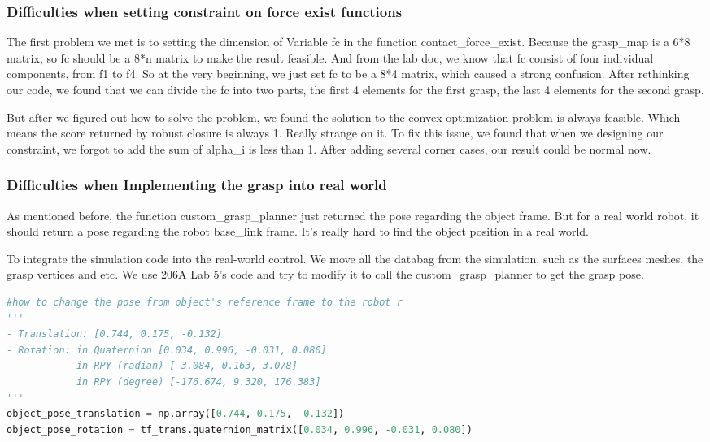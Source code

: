 \documentclass{article}
\begin{document}
\begin{multicols}{2}
\subsubsection{Difficulties when setting constraint on force exist functions}
The first problem we met is to setting the dimension of Variable fc in the function contact\_force\_exist. Because the grasp\_map is a 6*8 matrix, so fc should be a 8*n matrix to make the result feasible. And from the lab doc, we know that fc consist of four individual components, from f1 to f4. So at the very beginning, we just set fc to be a 8*4 matrix, which caused a strong confusion. After rethinking our code, we found that we can divide the fc into two parts, the first 4 elements for the first grasp, the last 4 elements for the second grasp.

But after we figured out how to solve the problem, we found the solution to the convex optimization problem is always feasible. Which means the score returned by robust closure is always 1. Really strange on it. To fix this issue, we found that when we designing our constraint, we forgot to add the sum of alpha\_i is less than 1. After adding several corner cases, our result could be normal now. 

\subsubsection{Difficulties when Implementing the grasp into real world}

As mentioned before, the function custom\_grasp\_planner just returned the pose regarding the object frame. But for a real world robot, it should return a pose regarding the robot base\_link frame. It's really hard to find the object position in a real world. 

To integrate the simulation code into the real-world control. We move all the databag from the simulation, such as the surfaces meshes, the grasp vertices and etc. We use 206A Lab 5's code and try to modify it to call the custom\_grasp\_planner to get the grasp pose. 

\begin{lstlisting}[language=Python]
#how to change the pose from object's reference frame to the robot r
'''
- Translation: [0.744, 0.175, -0.132]
- Rotation: in Quaternion [0.034, 0.996, -0.031, 0.080]
            in RPY (radian) [-3.084, 0.163, 3.078]
            in RPY (degree) [-176.674, 9.320, 176.383]
'''
object_pose_translation = np.array([0.744, 0.175, -0.132])
object_pose_rotation = tf_trans.quaternion_matrix([0.034, 0.996, -0.031, 0.080])


\end{lstlisting}
\end{multicols}
\end{document}
